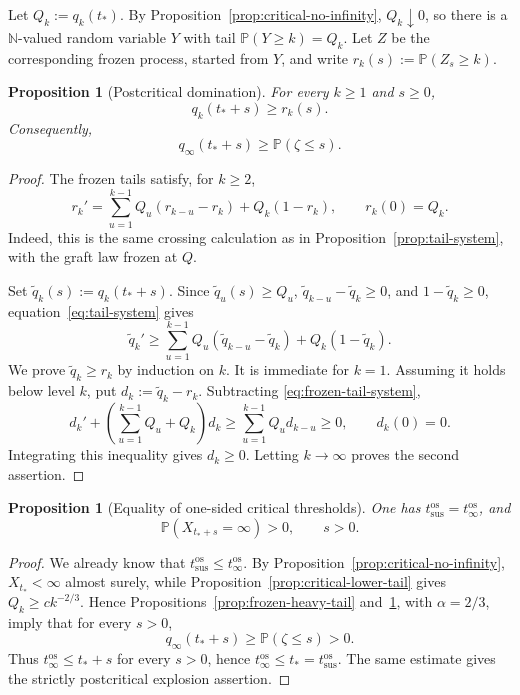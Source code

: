 \documentclass[11pt,a4paper]{amsart}
\newtheorem{proposition}[theorem]{Proposition}
\theoremstyle{remark}
\newcommand{\N}{\mathbb N}
\begin{document}
Let \(Q_k:=q_k(t_*)\). By
Proposition~\ref{prop:critical-no-infinity}, \(Q_k\downarrow0\), so there is
a \(\N\)-valued random variable \(Y\) with tail
\(\mathbb{P}(Y\geq k)=Q_k\). Let \(Z\) be the corresponding frozen process,
started from \(Y\), and write \(r_k(s):=\mathbb{P}(Z_s\geq k)\).

\begin{proposition}[Postcritical domination]
\label{prop:postcritical-domination}
For every \(k\geq1\) and \(s\geq0\),
\[
        q_k(t_*+s)\geq r_k(s).
\]
Consequently,
\[
        q_\infty(t_*+s)\geq\mathbb{P}(\zeta\leq s).
\]
\end{proposition}

\begin{proof}
The frozen tails satisfy, for \(k\geq2\),
\begin{equation}
\label{eq:frozen-tail-system}
        r_k'
        =
        \sum_{u=1}^{k-1}Q_u(r_{k-u}-r_k)
        +Q_k(1-r_k),
        \qquad r_k(0)=Q_k.
\end{equation}
Indeed, this is the same crossing calculation as in
Proposition~\ref{prop:tail-system}, with the graft law frozen
at \(Q\).

Set \(\widetilde q_k(s):=q_k(t_*+s)\). Since
\(\widetilde q_u(s)\geq Q_u\),
\(\widetilde q_{k-u}-\widetilde q_k\geq0\), and
\(1-\widetilde q_k\geq0\), equation~\eqref{eq:tail-system} gives
\[
        \widetilde q_k'
        \geq
        \sum_{u=1}^{k-1}Q_u
        (\widetilde q_{k-u}-\widetilde q_k)
        +Q_k(1-\widetilde q_k).
\]
We prove \(\widetilde q_k\geq r_k\) by induction on \(k\). It is immediate
for \(k=1\). Assuming it holds below level \(k\), put
\(d_k:=\widetilde q_k-r_k\). Subtracting
\eqref{eq:frozen-tail-system},
\[
        d_k'
        +
        \left(\sum_{u=1}^{k-1}Q_u+Q_k\right)d_k
        \geq
        \sum_{u=1}^{k-1}Q_ud_{k-u}
        \geq0,
        \qquad d_k(0)=0.
\]
Integrating this inequality gives \(d_k\geq0\). Letting \(k\to\infty\) proves
the second assertion.
\end{proof}

\begin{proposition}[Equality of one-sided critical thresholds]
\label{prop:equality-critical-times}
One has \(t_{\mathrm{sus}}^{\mathrm{os}}=t_{\infty}^{\mathrm{os}}\), and
\[
        \mathbb{P}(X_{t_*+s}=\infty)>0,\qquad s>0.
\]
\end{proposition}


\begin{proof}
We already know that
\(t_{\mathrm{sus}}^{\mathrm{os}}\leq t_{\infty}^{\mathrm{os}}\).
By Proposition~\ref{prop:critical-no-infinity}, $X_{t_*}<\infty$ almost
surely, while Proposition~\ref{prop:critical-lower-tail} gives
\(Q_k\geq ck^{-2/3}\). Hence Propositions~\ref{prop:frozen-heavy-tail}
and~\ref{prop:postcritical-domination}, with \(\alpha=2/3\), imply that
for every \(s>0\),
\[
        q_\infty(t_*+s)\geq\mathbb{P}(\zeta\leq s)>0.
\]
Thus \(t_{\infty}^{\mathrm{os}}\leq t_*+s\) for every \(s>0\), hence
\(t_{\infty}^{\mathrm{os}}\leq t_*=t_{\mathrm{sus}}^{\mathrm{os}}\). The same estimate gives the
strictly postcritical explosion assertion.
\end{proof}
\end{document}
